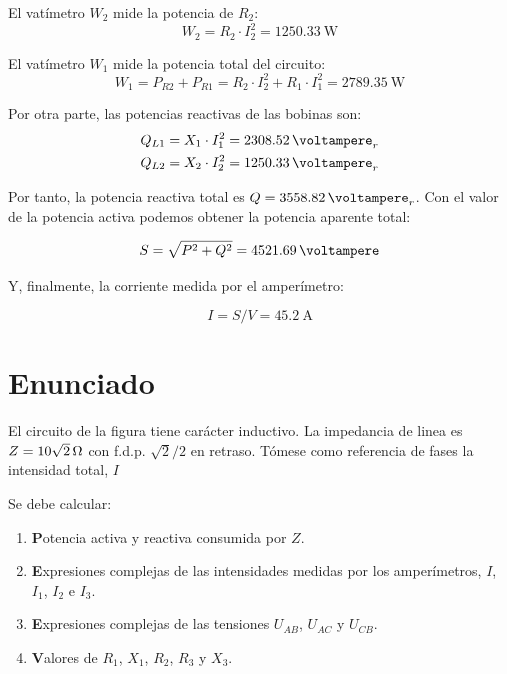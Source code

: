 El vatímetro $W_2$ mide la potencia de $R_2$:
\begin{equation*}
  W_2=R_2 \cdot I_2^2= \qty{1250.33}{\watt}
\end{equation*}

El vatímetro $W_1$ mide la potencia total del circuito:
\begin{equation*}
  W_1= P_{R2} + P_{R1} = R_2 \cdot I_2^2 + R_1 \cdot I_1^2 = \qty{2789.35}{\watt}
\end{equation*}

Por otra parte, las potencias reactivas de las bobinas son:
\begin{align*}
  Q_{L1} &= X_1 \cdot I_1^2 = \qty{2308.52}{\voltampere}_r\\
  Q_{L2} &= X_2 \cdot I_2^2 = \qty{1250.33}{\voltampere}_r
\end{align*}

Por tanto, la potencia reactiva total es $Q = \qty{3558.82}{\voltampere}_r$. Con el valor de la potencia activa podemos obtener la potencia aparente total:

\begin{equation*}
  S = \sqrt{P^2 + Q^2} = \qty{4521.69}{\voltampere}
\end{equation*}

Y, finalmente, la corriente medida por el amperímetro:

\begin{equation*}
  I = S/V = \qty{45.2}{\ampere}
\end{equation*}


\section{Enunciado}
El circuito de la figura tiene carácter inductivo.  La impedancia de
linea es $Z=\qty[parse-numbers=false]{10\sqrt{2}}{\ohm}$ con
f.d.p. $\sqrt{2}/2$ en retraso. Tómese como referencia de fases la
intensidad total, $I$

Se debe calcular:

\begin{enumerate}

\item \textbf Potencia activa y reactiva consumida por $Z$.

\item  \textbf Expresiones complejas de las intensidades medidas por los
  amperímetros, $I$, $I_1$, $I_2$ e $I_3$. 

\item  \textbf Expresiones complejas de las tensiones $U_{AB}$, $U_{AC}$ y
  $U_{CB}$.

\item  \textbf Valores de $R_1$, $X_1$, $R_2$, $R_3$ y $X_3$.

\end{enumerate}

